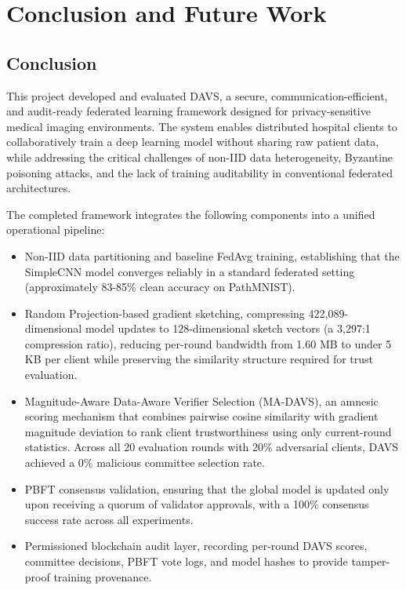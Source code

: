 \documentclass[12pt,a4paper]{article}
\begin{document}
\section{Conclusion and Future Work}
\subsection{Conclusion}
This project developed and evaluated DAVS, a secure, communication-efficient, and audit-ready federated learning framework designed for privacy-sensitive medical imaging environments. The system enables distributed hospital clients to collaboratively train a deep learning model without sharing raw patient data, while addressing the critical challenges of non-IID data heterogeneity, Byzantine poisoning attacks, and the lack of training auditability in conventional federated architectures.

The completed framework integrates the following components into a unified operational pipeline:
\begin{itemize}
    \item Non-IID data partitioning and baseline FedAvg training, establishing that the SimpleCNN model converges reliably in a standard federated setting (approximately 83-85\% clean accuracy on PathMNIST).
    \item Random Projection-based gradient sketching, compressing 422,089-dimensional model updates to 128-dimensional sketch vectors (a 3,297:1 compression ratio), reducing per-round bandwidth from 1.60 MB to under 5 KB per client while preserving the similarity structure required for trust evaluation.
    \item Magnitude-Aware Data-Aware Verifier Selection (MA-DAVS), an amnesic scoring mechanism that combines pairwise cosine similarity with gradient magnitude deviation to rank client trustworthiness using only current-round statistics. Across all 20 evaluation rounds with 20\% adversarial clients, DAVS achieved a 0\% malicious committee selection rate.
    \item PBFT consensus validation, ensuring that the global model is updated only upon receiving a quorum of validator approvals, with a 100\% consensus success rate across all experiments.
    \item Permissioned blockchain audit layer, recording per-round DAVS scores, committee decisions, PBFT vote logs, and model hashes to provide tamper-proof training provenance.
\end{itemize}
\end{document}

